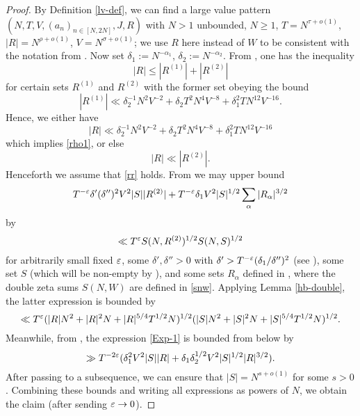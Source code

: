     \begin{proof}  By Definition \ref{lv-def}, we can find a large value pattern $(N,T,V,(a_n)_{n \in [N,2N]},J,R)$ with $N>1$ unbounded, $N \geq 1$, $T = N^{\tau+o(1)}$, $|R| = N^{\rho+o(1)}$, $V = N^{\sigma+o(1)}$; we use $R$ here instead of $W$ to be consistent with the notation from \cite{bourgain_large_2000}.  Now set $\delta_1 := N^{-\alpha_1}$, $\delta_2 := N^{-\alpha_2}$.  From \cite[(4.41), (4.42)]{bourgain_large_2000}, one has the inequality
        $$ |R| \leq |R^{(1)}| + |R^{(2)}|$$
        for certain sets $R^{(1)}$ and $R^{(2)}$ with the former set obeying the bound
    $$ |R^{(1)}| \ll \delta_2^{-1} N^2 V^{-2} + \delta_2 T^2 N^4 V^{-8} + \delta_1^2 T N^{12} V^{-16}.$$
    Hence, we either have
    $$ |R| \ll \delta_2^{-1} N^2 V^{-2} + \delta_2 T^2 N^4 V^{-8} + \delta_1^2 T N^{12} V^{-16}$$
    which implies \eqref{rho1}, or else
    \begin{equation}\label{rr}
        |R| \ll |R^{(2)}|.
    \end{equation}
    Henceforth we assume that \eqref{rr} holds. From \cite[(4.53), (4.54)]{bourgain_large_2000} we may upper bound
    \begin{equation}\label{Exp-1}
         T^{-\varepsilon} \delta' (\delta'')^2 V^2 |S| |R^{(2)}| + T^{-\varepsilon} \delta_1 V^2 |S|^{1/2} \sum_\alpha |R_\alpha|^{3/2}
    \end{equation}
    by
    \begin{equation}\label{Exp-2}
        \ll T^\varepsilon S(N,R^{(2)})^{1/2} S(N,S)^{1/2}
    \end{equation}
    for arbitrarily small fixed $\varepsilon$, some $\delta',\delta''>0$ with $\delta' > T^{-\varepsilon} (\delta_1/\delta'')^2$ (see \cite[(4.37)]{bourgain_large_2000}), some set $S$ (which will be non-empty by \cite[(4.47)]{bourgain_large_2000}), and some sets $R_\alpha$ defined in \cite[(4.39)]{bourgain_large_2000}, where the double zeta sums $S(N,W)$ are defined in \eqref{snw}.  Applying Lemma \ref{hb-double}, the latter expression is bounded by
    $$ \ll T^\varepsilon (|R|N^2 + |R|^2 N + |R|^{5/4} T^{1/2} N)^{1/2} (|S| N^2 + |S|^2 N + |S|^{5/4} T^{1/2} N)^{1/2}.$$
    Meanwhile, from \cite[(4.57)]{bourgain_large_2000}, the expression \eqref{Exp-1} is bounded from below by
    $$ \gg T^{-2\varepsilon} (\delta_1^2 V^2 |S| |R| + \delta_1 \delta_2^{1/2} V^2 |S|^{1/2} |R|^{3/2}).$$
    After passing to a subsequence, we can ensure that $|S| = N^{s+o(1)}$ for some $s > 0$.
    Combining these bounds and writing all expressions as powers of $N$, we obtain the claim (after sending $\varepsilon \to 0$).
    \end{proof}


